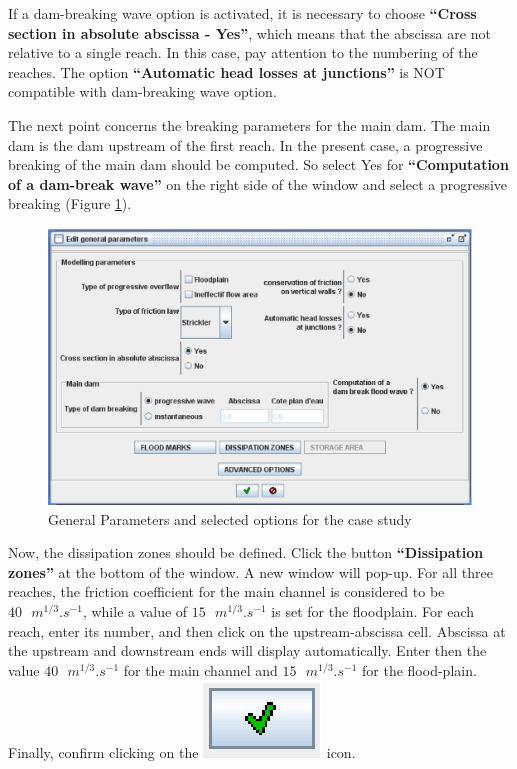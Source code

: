 \documentclass[a4paper,12pt]{article}
\begin{document}
\vspace{0.5cm}

If a dam-breaking wave option is activated, it is necessary to choose
\textbf{{}``Cross section in absolute abscissa - Yes''}, which means
that the abscissa are not relative to a single reach. In this case, pay attention
to the numbering of the reaches. The option \textbf{{}``Automatic
head losses at junctions''} is NOT compatible with dam-breaking
wave option.

\vspace{0.5cm}

The next point concerns the breaking parameters for the main dam.
The main dam is the dam upstream of the first reach. In the present
case, a progressive breaking of the main
dam should be computed. So select Yes for \textbf{{}``Computation
of a dam-break wave''} on the right side of the window and select
a progressive breaking (Figure \ref{fig:General-Parameters-Editor}).

\newpage

\begin{figure}[h]
  \begin{center}
  \includegraphics[scale=0.5]{general-params}
  \caption{General Parameters and selected options for the case study}
  \label{fig:General-Parameters-Editor}
  \end{center}
\end{figure}


Now, the dissipation zones should be defined. Click the button
\textbf{{}``Dissipation zones''} at the bottom of the window.
A new window will pop-up. For all three reaches, the friction coefficient
for the main channel is considered to be $40 \mbox{ }m^{1/3}.s^{-1}$, while a value of $15\mbox{ }m^{1/3}.s^{-1}$ is set for the floodplain. For each reach, enter
its number, and then click on the upstream-abscissa cell. Abscissa at the upstream and downstream ends will display automatically.
Enter then the value $40 \mbox{ }m^{1/3}.s^{-1}$ for the main channel and $15\mbox{ }m^{1/3}.s^{-1}$ for the flood-plain.
Finally, confirm clicking on the \includegraphics[scale=0.6]{valid}
icon.
\end{document}

